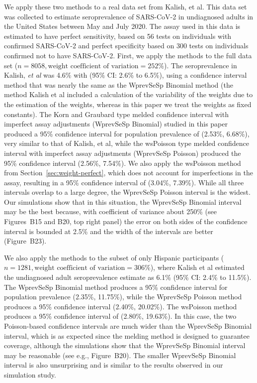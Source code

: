 We apply these two methods to a real data set from Kalish, et al.\cite{Kali:2021}
This data set was collected to estimate seroprevalence of SARS-CoV-2 in undiagnosed adults in the United States between May and July 2020.
The assay used in this data is estimated to have perfect sensitivity, based on 56 tests on individuals with confirmed SARS-CoV-2 and perfect specificity based on 300 tests on individuals confirmed not to have SARS-CoV-2.
First, we apply the methods to the full data set (\( n = 8058, \text{weight coefficient of variation} = 252\%\)).
The seroprevalence in Kalish, {\it et al } was 4.6\% with (95\% CI: 2.6\% to 6.5\%), using a confidence interval method that was nearly the same as the WprevSeSp Binomial method (the method Kalish et al included a calculation of the variability of the weights due to the estimation of the weights, whereas in this paper we treat the weights as fixed constants).
The Korn and Graubard type melded confidence interval with imperfect assay adjustments (WprevSeSp Binomial) studied in this paper produced a 95\% confidence interval for population prevalence of (2.53\%, 6.68\%), very similar to that of Kalish, et al, while the wsPoisson type melded confidence interval with imperfect assay adjustments (WprevSeSp Poisson) produced the 95\% confidence interval (2.56\%, 7.54\%).
We also apply the wsPoisson method from Section~\ref{sec:weight-perfect}, which does not account for imperfections in the assay, resulting in a 95\% confidence interval of (3.04\%, 7.39\%).
While all three intervals overlap to a large degree, the WprevSeSp Poisson interval is the widest.
Our simulations show that in this situation, the WprevSeSp Binomial interval may be the best because, with coefficient of variance about 250\% (see Figures~B15 and B20, top right panel) the error on both sides of the confidence interval is bounded at 2.5\% and the width of the intervals are better (Figure~B23).


We also apply the methods to the subset of only Hispanic participants (\( n = 1281, \text{weight coefficient of variation} = 306\% \)), where Kalish et al estimated the undiagnosed adult seroprevalence estimate as 6.1\% (95\% CI: 2.4\% to 11.5\%).
The WprevSeSp Binomial method produces a 95\% confidence interval for population prevalence (2.35\%, 11.75\%), while the WprevSeSp Poisson method produces a 95\% confidence interval (2.40\%, 20.02\%).
The wsPoisson method produces a 95\% confidence interval of (2.80\%, 19.63\%).
In this case, the two Poisson-based confidence intervals are much wider than the WprevSeSp Binomial interval, which is as expected since the melding method is designed to guarantee coverage, although the simulations show that the WprevSeSp Binomial interval may be reasonable (see e.g., Figure~B20).
The smaller WprevSeSp Binomial interval is also unsurprising and is similar to the results observed in our simulation study.

